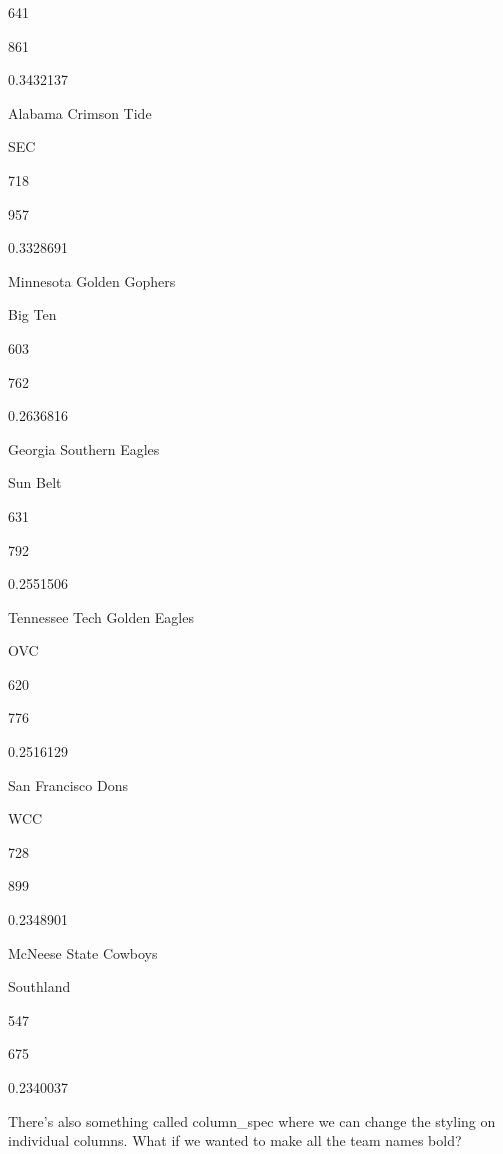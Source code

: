 \documentclass[
]{book}
\newenvironment{Shaded}{\begin{snugshade}}{\end{snugshade}}
\newcommand{\DataTypeTok}[1]{\textcolor[rgb]{0.13,0.29,0.53}{#1}}
\newcommand{\DecValTok}[1]{\textcolor[rgb]{0.00,0.00,0.81}{#1}}
\newcommand{\KeywordTok}[1]{\textcolor[rgb]{0.13,0.29,0.53}{\textbf{#1}}}
\newcommand{\NormalTok}[1]{#1}
\newcommand{\OperatorTok}[1]{\textcolor[rgb]{0.81,0.36,0.00}{\textbf{#1}}}
\newcommand{\StringTok}[1]{\textcolor[rgb]{0.31,0.60,0.02}{#1}}
\begin{document}
641

861

0.3432137

Alabama Crimson Tide

SEC

718

957

0.3328691

Minnesota Golden Gophers

Big Ten

603

762

0.2636816

Georgia Southern Eagles

Sun Belt

631

792

0.2551506

Tennessee Tech Golden Eagles

OVC

620

776

0.2516129

San Francisco Dons

WCC

728

899

0.2348901

McNeese State Cowboys

Southland

547

675

0.2340037

There's also something called column\_spec where we can change the styling on individual columns. What if we wanted to make all the team names bold?

\begin{Shaded}
\end{Shaded}
\end{document}
